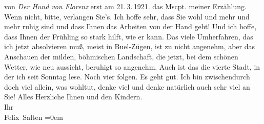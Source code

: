 \begin{ledgroupsized}[t]{13cm}
{{{               von \emph{Der Hund von Florenz}
            erst am 21. 3. 1921.}}}\label{K_L03569-1h} das
               Mscpt. meiner Erzählung. Wenn nicht,
               bitte, verlangen Sie’s. Ich hoffe sehr, dass Sie wohl und mehr und mehr ruhig sind
               und dass Ihnen das Arbeiten von der Hand geht! Und ich hoffe, dass Ihnen der Frühling
               so stark hilft, wie er kann. Das viele Umherfahren, das ich jetzt absolvieren muß,
               meist in Bu{\geminationm}el-Zügen, ist zu nicht angenehm, aber das
               Anschauen der milden, böhmischen Landschaft, die
               jetzt, bei dem schönen Wetter, wie neu aussieht, beruhigt so angenehm. Auch ist das
               die vierte Stadt, in der ich seit Sonntag lese. Noch vier folgen. Es geht gut. Ich
               bin zwischendurch doch viel allein, was wohltut, denke viel und denke natürlich auch
               sehr viel an Sie! \pend
           \pstart
           Alles Herzliche Ihnen und den Kindern. {\\[\baselineskip]}Ihr {\\[\baselineskip]}\spacefill\mbox{Felix Salten}\pend
           \leftskip=0em{}
         
         \endnumbering{}\end{ledgroupsized}\begin{anhang}\end{anhang}\newcommand{\dateiname}{L03569}\newcommand{\titel}{Felix Salten an Arthur Schnitzler, 18. 3. 1921}\newcommand{\editorInnen}{Martin Anton Müller und Laura Untner}
      